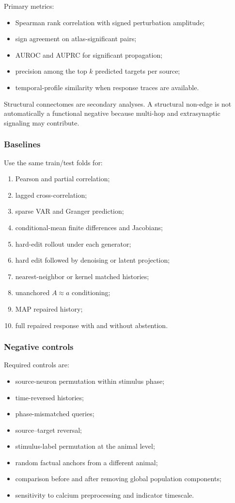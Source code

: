 \documentclass{article}
\theoremstyle{remark}
\begin{document}
Primary metrics:
\begin{itemize}[leftmargin=1.5em]
  \item Spearman rank correlation with signed perturbation amplitude;
  \item sign agreement on atlas-significant pairs;
  \item AUROC and AUPRC for significant propagation;
  \item precision among the top \(k\) predicted targets per source;
  \item temporal-profile similarity when response traces are available.
\end{itemize}
Structural connectomes \citep{cook2019whole,witvliet2021connectomes} are
secondary analyses. A structural non-edge is not automatically a functional
negative because multi-hop and extrasynaptic signaling may contribute.

\subsubsection{Baselines}

Use the same train/test folds for:
\begin{enumerate}[leftmargin=1.5em]
  \item Pearson and partial correlation;
  \item lagged cross-correlation;
  \item sparse VAR and Granger prediction;
  \item conditional-mean finite differences and Jacobians;
  \item hard-edit rollout under each generator;
  \item hard edit followed by denoising or latent projection;
  \item nearest-neighbor or kernel matched histories;
  \item unanchored \(A\approx a\) conditioning;
  \item MAP repaired history;
  \item full repaired response with and without abstention.
\end{enumerate}

\subsubsection{Negative controls}

Required controls are:
\begin{itemize}[leftmargin=1.5em]
  \item source-neuron permutation within stimulus phase;
  \item time-reversed histories;
  \item phase-mismatched queries;
  \item source--target reversal;
  \item stimulus-label permutation at the animal level;
  \item random factual anchors from a different animal;
  \item comparison before and after removing global population components;
  \item sensitivity to calcium preprocessing and indicator timescale.
\end{itemize}
\end{document}

